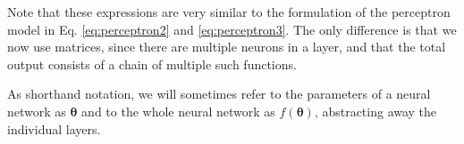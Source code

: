 Note that these expressions are very similar to the formulation of the perceptron model in Eq. \eqref{eq:perceptron2} and \eqref{eq:perceptron3}. The only difference is that we now use matrices, since there are multiple neurons in a layer, and that the total output consists of a chain of multiple such functions.

As shorthand notation, we will sometimes refer to the parameters of a neural network as $\bm{\theta}$ and to the whole neural network as $f(\bm{\theta})$, abstracting away the individual layers.
\begin{comment}
\begin{equation}
f(\bm{x}) = f^{(L)}(\bm{W}^{(L)\top}f^{(L-1)}(\bm{W}^{(L-1)\top}\dotsm+\bm{b}^{(l-1)})+\bm{b}^{(L)}
\end{equation}
\end{comment}